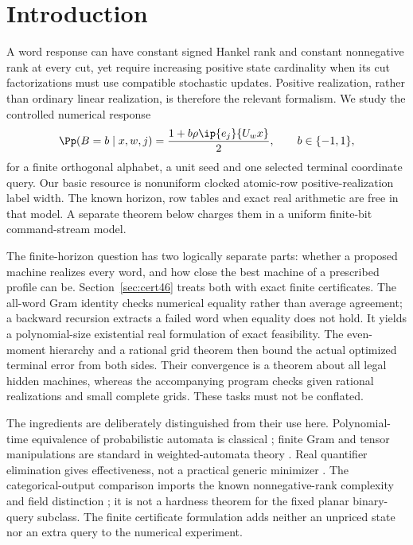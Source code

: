 \section{Introduction}
A word response can have constant signed Hankel rank and constant
nonnegative rank at every cut, yet require increasing positive state
cardinality when its cut factorizations must use compatible stochastic
updates. Positive realization, rather than ordinary linear realization,
is therefore the relevant formalism. We study the controlled numerical
response
\begin{equation}\label{eq:target}
 \Pp(B=b\mid x,w,j)=\frac{1+b\rho\ip{e_j}{U_wx}}2,
 \qquad b\in\{-1,1\},
\end{equation}
for a finite orthogonal alphabet, a unit seed and one selected terminal
coordinate query. Our basic resource is nonuniform clocked atomic-row
positive-realization label width. The known horizon, row tables and
exact real arithmetic are free in that model. A separate theorem below
charges them in a uniform finite-bit command-stream model.

The finite-horizon question has two logically separate parts: whether a
proposed machine realizes every word, and how close the best machine
of a prescribed profile can be. Section~\ref{sec:cert46} treats both
with exact finite certificates. The all-word Gram identity checks
numerical equality rather than average agreement; a backward recursion
extracts a failed word when equality does not hold. It yields a
polynomial-size existential real formulation of exact feasibility.
The even-moment hierarchy and a rational grid theorem then bound the
actual optimized terminal error from both sides. Their convergence
is a theorem about all legal hidden machines, whereas the accompanying
program checks given rational realizations and small complete grids.
These tasks must not be conflated.

The ingredients are deliberately distinguished from their use here.
Polynomial-time equivalence of probabilistic automata is classical
\cite{Tzeng92}; finite Gram and tensor manipulations are standard in
weighted-automata theory \cite{BPP15}. Real quantifier elimination gives
effectiveness, not a practical generic minimizer \cite{BPR}. The
categorical-output comparison imports the known nonnegative-rank
complexity and field distinction \cite{Shitov18}; it is not a hardness
theorem for the fixed planar binary-query subclass. The finite
certificate formulation adds neither an unpriced state nor an extra
query to the numerical experiment.

